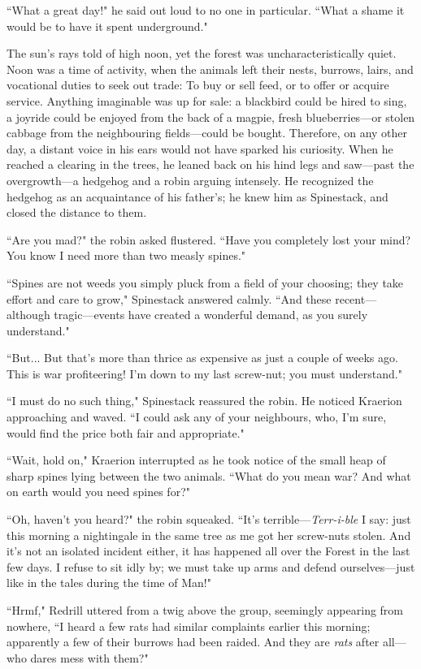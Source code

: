 ``What a great day!" he said out loud to no one in particular.
``What a shame it would be to have it spent underground."

The sun's rays told of high noon, yet the forest was uncharacteristically quiet.
Noon was a time of activity, when the animals left their nests, burrows, lairs, and vocational duties to seek out trade:
To buy or sell feed, or to offer or acquire service.
Anything imaginable was up for sale: a blackbird could be hired to sing, a joyride could be enjoyed from the back of a magpie, fresh blueberries---or stolen cabbage from the neighbouring fields---could be bought.
Therefore, on any other day, a distant voice in his ears would not have sparked his curiosity.
When he reached a clearing in the trees, he leaned back on his hind legs and saw---past the overgrowth---a hedgehog and a robin arguing intensely.
He recognized the hedgehog as an acquaintance of his father's; he knew him as Spinestack, and closed the distance to them.

``Are you mad?" the robin asked flustered.
``Have you completely lost your mind?
You know I need more than two measly spines."

``Spines are not weeds you simply pluck from a field of your choosing; they take effort and care to grow," Spinestack answered calmly.
``And these recent---although tragic---events have created a wonderful demand, as you surely understand."

``But... But that's more than thrice as expensive as just a couple of weeks ago.
This is war profiteering!
I'm down to my last screw-nut; you must understand."

``I must do no such thing," Spinestack reassured the robin.
He noticed Kraerion approaching and waved.
``I could ask any of your neighbours, who, I'm sure, would find the price both fair and appropriate."

``Wait, hold on," Kraerion interrupted as he took notice of the small heap of sharp spines lying between the two animals.
``What do you mean war? And what on earth would you need spines for?"

``Oh, haven't you heard?" the robin squeaked.
``It's terrible---\textit{Terr-i-ble} I say: just this morning a nightingale in the same tree as me got her screw-nuts stolen.
And it's not an isolated incident either, it has happened all over the Forest in the last few days.
I refuse to sit idly by; we must take up arms and defend ourselves---just like in the tales during the time of Man!"

``Hrmf," Redrill uttered from a twig above the group, seemingly appearing from nowhere, ``I heard a few rats had similar complaints earlier this morning; apparently a few of their burrows had been raided. And they are \textit{rats} after all---who dares mess with them?"

